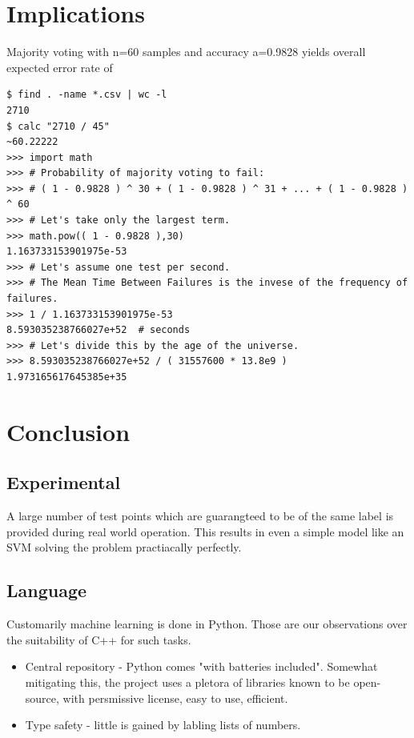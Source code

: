 \documentclass{article}
\begin{document}
\section{Implications}
Majority voting with n=60 samples and accuracy a=0.9828 yields overall expected error rate of
\begin{verbatim}
$ find . -name *.csv | wc -l
2710
$ calc "2710 / 45"
~60.22222
>>> import math
>>> # Probability of majority voting to fail:
>>> # ( 1 - 0.9828 ) ^ 30 + ( 1 - 0.9828 ) ^ 31 + ... + ( 1 - 0.9828 ) ^ 60
>>> # Let's take only the largest term.
>>> math.pow(( 1 - 0.9828 ),30)
1.163733153901975e-53
>>> # Let's assume one test per second.
>>> # The Mean Time Between Failures is the invese of the frequency of failures.
>>> 1 / 1.163733153901975e-53
8.593035238766027e+52  # seconds
>>> # Let's divide this by the age of the universe.
>>> 8.593035238766027e+52 / ( 31557600 * 13.8e9 )
1.973165617645385e+35
\end{verbatim}


\section{Conclusion}
\subsection{Experimental}
A large number of test points which are guarangteed to be of the same label is provided during real world operation.
This results in even a simple model like an SVM solving the problem practiacally perfectly.

\subsection{Language}
Customarily machine learning is done in Python.
Those are our observations over the suitability of C++ for such tasks.
\begin{itemize}
\item{Central repository - Python comes "with batteries included". Somewhat mitigating this, the project uses a pletora of libraries known to be open-source, with persmissive license, easy to use, efficient.}
\item{Type safety - little is gained by labling lists of numbers.}
\end{itemize}


%
\printbibliography
\end{document}
